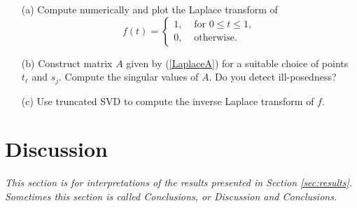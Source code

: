 \documentclass[12pt,a4]{article}
\begin{document}
\begin{itemize}
\item[(a)] Compute numerically and plot the Laplace transform of 
$$
  f(t) = \left\{\begin{array}{ll}1,&\mbox{ for }0\leq t \leq 1,\\0, &\mbox{ otherwise.}\end{array}\right.
$$

\item[(b)] Construct matrix $A$ given by (\ref{LaplaceA}) for a suitable choice of points $t_\ell$ and $s_j$. Compute the singular values of $A$. Do you detect ill-posedness?

\item[(c)] Use truncated SVD to compute the inverse Laplace transform of $f$.
\end{itemize}


\section{Discussion}

{\em This section is for interpretations of the results presented in Section \ref{sec:results}. Sometimes this section is called Conclusions, or Discussion and Conclusions.}
\end{document}
